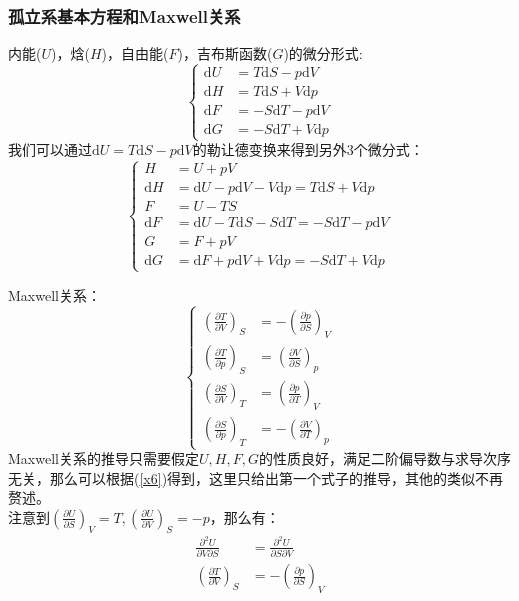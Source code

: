 \documentclass[12pt]{article}
\begin{document}
\subsubsection{孤立系基本方程和Maxwell关系}
\noindent 内能($U$)，焓($H$)，自由能($F$)，吉布斯函数($G$)的微分形式:
\begin{equation}
	\left\{
	\begin{split}
		\mathrm{d}U&=T\mathrm{d}S-p\mathrm{d}V\\
		\mathrm{d}H&=T\mathrm{d}S+V\mathrm{d}p\\
		\mathrm{d}F&=-S\mathrm{d}T-p\mathrm{d}V\\
		\mathrm{d}G&=-S\mathrm{d}T+V\mathrm{d}p
	\end{split}
\right.
\end{equation}
我们可以通过$\mathrm{d}U=T\mathrm{d}S-p\mathrm{d}V$的勒让德变换来得到另外3个微分式：
\begin{equation}
		\left\{
	\begin{split}
		H&=U+pV\\
		\mathrm{d}H&=\mathrm{d}U-p\mathrm{d}V-V\mathrm{d}p=T\mathrm{d}S+V\mathrm{d}p\\
		F&=U-TS\\
		\mathrm{d}F&=\mathrm{d}U-T\mathrm{d}S-S\mathrm{d}T=-S\mathrm{d}T-p\mathrm{d}V\\
		G&=F+pV\\
		\mathrm{d}G&=\mathrm{d}F+p\mathrm{d}V+V\mathrm{d}p=-S\mathrm{d}T+V\mathrm{d}p
	\end{split}
\right.
\label{x6}
\end{equation}

\noindent
Maxwell关系：
\begin{equation}
	\left\{
	\begin{split}
		(\frac{\partial T}{\partial V})_S&=-(\frac{\partial p}{\partial S})_V\\
		(\frac{\partial T}{\partial p})_S&=(\frac{\partial V}{\partial S})_p\\
		(\frac{\partial S}{\partial V})_T&=(\frac{\partial p}{\partial T})_V\\
		(\frac{\partial S}{\partial p})_T&=-(\frac{\partial V}{\partial T})_p
	\end{split}
	\right.
\end{equation}
Maxwell关系的推导只需要假定$U,H,F,G$的性质良好，满足二阶偏导数与求导次序无关，那么可以根据(\ref{x6})得到，这里只给出第一个式子的推导，其他的类似不再赘述。\\
注意到$(\frac{\partial U}{\partial S})_V=T, (\frac{\partial U}{\partial V})_S=-p$，那么有：
\begin{equation}
	\begin{split}
		\frac{\partial^2 U}{\partial V \partial S}&=	\frac{\partial^2 U}{\partial S \partial V}\\
			(\frac{\partial T}{\partial V})_S&=-(\frac{\partial p}{\partial S})_V
	\end{split}
\end{equation}
\end{document}
